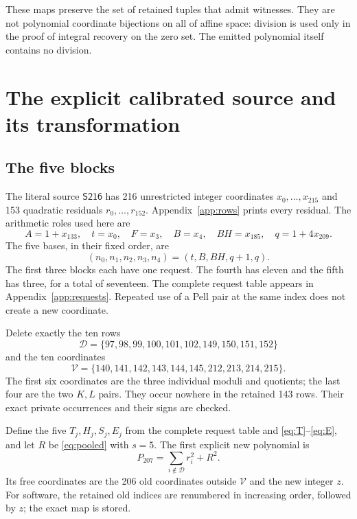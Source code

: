 \documentclass[10pt,letterpaper]{article}
\theoremstyle{remark}\newtheorem{remark}[theorem]{Remark}
\newcommand{\src}{\textsf{S216}}
\begin{document}
These maps preserve the set of retained tuples that admit witnesses.
They are not polynomial coordinate bijections on all of affine space:
division is used only in the proof of integral recovery on the zero set.
The emitted polynomial itself contains no division.

\section{The explicit calibrated source and its transformation}

\subsection{The five blocks}

The literal source $\src$ has 216 unrestricted integer coordinates
$x_0,\ldots,x_{215}$ and 153 quadratic residuals
$r_0,\ldots,r_{152}$. Appendix~\ref{app:rows} prints every residual.
The arithmetic roles used here are
\[
 A=1+x_{133},\quad t=x_0,\quad F=x_3,\quad B=x_4,
 \quad BH=x_{185},\quad q=1+4x_{209}.
\]
The five bases, in their fixed order, are
\begin{equation}
 (n_0,n_1,n_2,n_3,n_4)=(t,B,BH,q+1,q).\label{eq:fivebases}
\end{equation}
The first three blocks each have one request. The fourth has eleven and
the fifth has three, for a total of seventeen. The complete request table
appears in Appendix~\ref{app:requests}. Repeated use of a Pell pair at
the same index does not create a new coordinate.

Delete exactly the ten rows
\begin{equation}
 \mathcal D=\{97,98,99,100,101,102,149,150,151,152\}\label{eq:deletedrows}
\end{equation}
and the ten coordinates
\begin{equation}
 \mathcal V=\{140,141,142,143,144,145,212,213,214,215\}.
 \label{eq:deletedvars}
\end{equation}
The first six coordinates are the three individual moduli and quotients;
the last four are the two $K,L$ pairs. They occur nowhere in the retained
143 rows. Their exact private occurrences and their signs are checked.

Define the five $T_j,H_j,S_j,E_j$ from the complete request table and
\eqref{eq:T}--\eqref{eq:E}, and let $R$ be \eqref{eq:pooled} with
$s=5$. The first explicit new polynomial is
\begin{equation}
 \boxed{\quad P_{207}=\sum_{i\notin\mathcal D}r_i^2+R^2.\quad}
 \label{eq:P207}
\end{equation}
Its free coordinates are the 206 old coordinates outside $\mathcal V$
and the new integer $z$. For software, the retained old indices are
renumbered in increasing order, followed by $z$; the exact map is stored.
\end{document}
